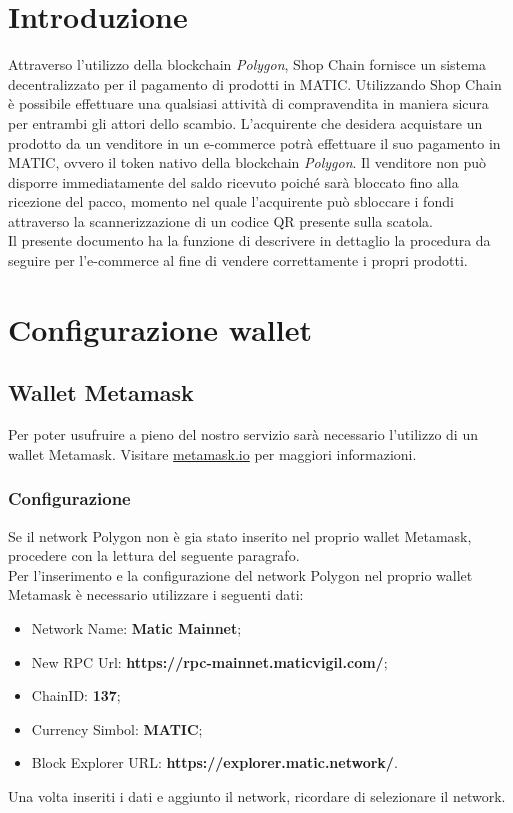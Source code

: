 \documentclass[a4paper, 12pt]{article}
\begin{document}
\makefrontpage
\tableofcontents
\newpage

\section{Introduzione}
Attraverso l'utilizzo della blockchain \textit{Polygon}, Shop Chain fornisce un sistema decentralizzato per il pagamento di prodotti in MATIC. Utilizzando Shop Chain è possibile effettuare una qualsiasi attività di compravendita in maniera sicura per entrambi gli attori dello scambio. L'acquirente che desidera acquistare un prodotto da un venditore in un e-commerce potrà effettuare il suo pagamento in MATIC, ovvero il token nativo della blockchain \textit{Polygon}. Il venditore non può disporre immediatamente del saldo ricevuto poiché sarà bloccato fino alla ricezione del pacco, momento nel quale l'acquirente può sbloccare i fondi attraverso la scannerizzazione di un codice QR presente sulla scatola.
\\Il presente documento ha la funzione di descrivere in dettaglio la procedura da seguire per l'e-commerce al fine di vendere correttamente i propri prodotti.

\section{Configurazione wallet}
\subsection{Wallet Metamask}
Per poter usufruire a pieno del nostro servizio sarà necessario l'utilizzo di un wallet Metamask. Visitare \href{https://www.metamask.io}{metamask.io} per maggiori informazioni.
\subsubsection{Configurazione}
Se il network Polygon non è gia stato inserito nel proprio wallet Metamask, procedere con la lettura del seguente paragrafo.
\\Per l'inserimento e la configurazione del network Polygon nel proprio wallet Metamask è necessario utilizzare i seguenti dati:
\begin{itemize}
\item Network Name: \textbf{Matic Mainnet};
\item New RPC Url: \textbf{https://rpc-mainnet.maticvigil.com/};
\item ChainID: \textbf{137};
\item Currency Simbol: \textbf{MATIC};
\item Block Explorer URL: \textbf{https://explorer.matic.network/}.
\end{itemize}
Una volta inseriti i dati e aggiunto il network, ricordare di selezionare il network.
\end{document}
